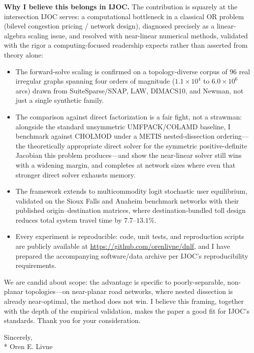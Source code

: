 \documentclass[10pt]{article}
\begin{document}
\textbf{Why I believe this belongs in IJOC.} The contribution is squarely at the intersection IJOC serves: a
computational bottleneck in a classical OR problem (bilevel congestion pricing / network design), diagnosed
precisely as a linear-algebra scaling issue, and resolved with near-linear numerical methods, validated with
the rigor a computing-focused readership expects rather than asserted from theory alone:

\begin{itemize}
\item The forward-solve scaling is confirmed on a topology-diverse corpus of 96 real irregular graphs spanning
four orders of magnitude ($1.1\times10^4$ to $6.0\times10^6$ arcs) drawn from SuiteSparse/SNAP, LAW, DIMACS10,
and Newman, not just a single synthetic family.
\item The comparison against direct factorization is a fair fight, not a strawman: alongside the standard
unsymmetric UMFPACK/COLAMD baseline, I benchmark against CHOLMOD under a METIS nested-dissection
ordering---the theoretically appropriate direct solver for the symmetric positive-definite Jacobian this
problem produces---and show the near-linear solver still wins with a widening margin, and completes at network
sizes where even that stronger direct solver exhausts memory.
\item The framework extends to multicommodity logit stochastic user equilibrium, validated on the Sioux Falls
and Anaheim benchmark networks with their published origin--destination matrices, where destination-bundled
toll design reduces total system travel time by $7.7$--$13.1\%$.
\item Every experiment is reproducible: code, unit tests, and reproduction scripts are publicly available at
\url{https://github.com/orenlivne/dnlf}, and I have prepared the accompanying software/data archive per IJOC's
reproducibility requirements.
\end{itemize}

We are candid about scope: the advantage is specific to poorly-separable, non-planar topologies---on
near-planar road networks, where nested dissection is already near-optimal, the method does not win. I
believe this framing, together with the depth of the empirical validation, makes the paper a good fit for
IJOC's standards. Thank you for your consideration.

Sincerely,\\*
Oren E. Livne
\end{document}
